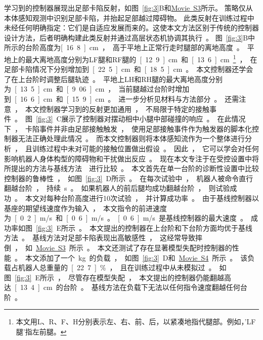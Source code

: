 \documentclass[9pt,twocolumn,twoside]{osajnl}
\begin{document}
学习到的控制器展现出足部卡陷反射，如图~\ref{fig:3}B和\href{https://youtu.be/tPixnjLbTvE}{Movie~S3}所示。
策略仅从本体感知观测中识别足部卡陷，并抬起足部越过障碍物。
此类反射在训练过程中未经任何明确指定：它们是自适应发展而来的。这使本文方法区别于传统的控制器设计方法，后者明确构建此类反射并通过高层状态机协调其执行~\cite{jenelten2019dynamic,focchi2020heuristic}。
图~\ref{fig:3}B中所示的台阶高度为\unit[16.8]{cm}，高于平地上正常行走时腿部的离地高度。
平地上的最大离地高度分别为LF腿和RF腿的\unit[12.9]{cm}和\unit[13.6]{cm}\footnote{本文用L、R、F、H分别表示左、右、前、后，以紧凑地指代腿部。例如，'LF腿'指左前腿。}，在足部卡陷情况下分别增加到\unit[22.5]{cm}和\unit[18.5]{cm}。
本文控制器还学会了在上台阶时调整后腿轨迹。平地上LH和RH腿的最大离地高度分别为\unit[13.5]{cm}和\unit[9.06]{cm}，当前腿越过台阶时增加到\unit[16.6]{cm}和\unit[15.9]{cm}。进一步分析见材料与方法部分。
还需注意，本文控制器学习到的反射更加通用，不局限于特定的接触事件。图~\ref{fig:3}C展示了控制器对摆动相中小腿中部碰撞的响应。在此情况下，卡陷事件并非由足部接触触发，使用足部接触事件作为触发器的脚本化控制器无法正确处理此情况。而本文控制器则将本体感知流作为一个整体进行分析，且训练过程中未对可能的接触位置做出假设。因此，它可以学会对任何影响机器人身体构型的障碍物和干扰做出反应。

现在本文专注于在受控设置中将所提出的方法与基线方法~\cite{bellicoso2018dynamic,jenelten2019dynamic}进行比较。
本文首先在单一台阶的诊断性设置中比较控制器的鲁棒性，如图~\ref{fig:3}D所示。
在每次试验中，机器人被命令直行翻越台阶，持续\unit[10]{s}。如果机器人的前后腿均成功翻越台阶，则试验成功。本文对每种台阶高度进行10次试验，并计算成功率。
由于基线控制器以基座的期望线速度作为输入，本文指令的前进速度为\unit[0.2]{m/s}和\unit[0.6]{m/s}。\unit[0.6]{m/s}是基线控制器的最大速度。
成功率如图~\ref{fig:3}E所示。本文提出的控制器在上台阶和下台阶方面均优于基线方法。
基线方法对足部卡陷表现出高敏感性，这经常导致摔倒，如\href{https://youtu.be/tPixnjLbTvE}{Movie~S3}所示。

本文还测试了存在显著模型失配时控制器的性能。本文添加了一个\unit[10]{kg}的负载，如图~\ref{fig:3}D和\href{https://youtu.be/3Nr47MXCFO0}{Movie~S4}所示。该负载占机器人总重量的\unit[22.7]{\%}，且在训练过程中从未模拟过。如图~\ref{fig:3}E所示，尽管存在模型失配，本文提出的控制器仍能翻越高达\unit[13.4]{cm}的台阶。基线方法在负载下无法以任何指令速度翻越任何台阶。
\end{document}
